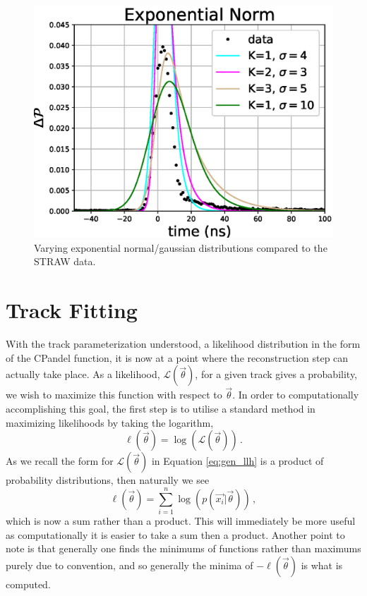 \begin{figure}[H]
  \centering
  \includegraphics[width=12cm]{./Figures/reco_plots/straw_data_fit_exponnorm.eps}
  \caption{Varying exponential normal/gaussian distributions compared to the STRAW data.}
  \label{fig:straw_data_exponnorm}
\end{figure}


\section{Track Fitting}

With the track parameterization understood, a likelihood distribution in the form of the CPandel function, it is now at a point where the reconstruction step can actually take place. As a likelihood, $\mathcal{L}(\vec{\theta})$, for a given track gives a probability, we wish to maximize this function with respect to $\vec{\theta}$. In order to computationally accomplishing this goal, the first step is to utilise a standard method in maximizing likelihoods by taking the logarithm,
\begin{equation}  
  \ell(\vec{\theta}) = \log\left(\mathcal{L}(\vec{\theta})\right)\, .
\end{equation}
As we recall the form for $\mathcal{L}(\vec{\theta})$ in Equation \ref{eq:gen_llh} is a product of probability distributions, then naturally we see
\begin{equation}
  \ell(\vec{\theta}) = \sum_{i=1}^{n}\log\left(p\left(\vec{x_{i}}\bigr\rvert\vec{\theta}\right)\right)\, ,
\end{equation}
which is now a sum rather than a product. This will immediately be more useful as computationally it is easier to take a sum then a product. Another point to note is that generally one finds the minimums of functions rather than maximums purely due to convention, and so generally the minima of $-\ell(\vec{\theta})$ is what is computed.

